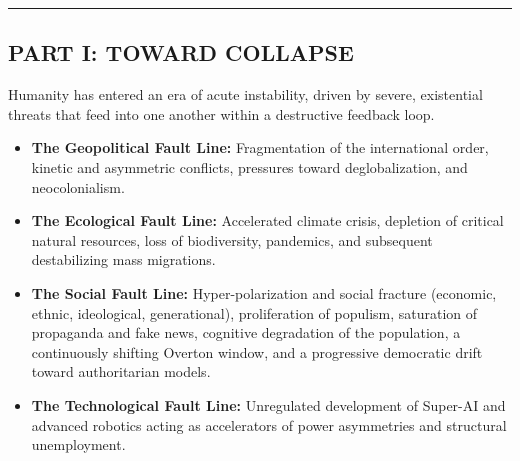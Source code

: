 \documentclass[11pt,a4paper,oneside]{article} %
\providecommand{\tightlist}{%
  \setlength{\itemsep}{0pt}\setlength{\parskip}{0pt}}
\begin{document}
\begin{center}\rule{0.5\linewidth}{0.5pt}\end{center}

\clearpage %
\hypertarget{part-i-toward-collapse}{%
\subsection{PART I: TOWARD COLLAPSE}\label{part-i-toward-collapse}}

\hypertarget{the-context-of-global-turbulence}{%
\label{the-context-of-global-turbulence}}

Humanity has entered an era of acute instability, driven by severe,
existential threats that feed into one another within a destructive
feedback loop.

\hypertarget{four-interconnected-fault-lines}{%
\label{four-interconnected-fault-lines}}

\begin{itemize}
\tightlist
\item
  \textbf{The Geopolitical Fault Line:} Fragmentation of the
  international order, kinetic and asymmetric conflicts, pressures
  toward deglobalization, and neocolonialism.
\item
  \textbf{The Ecological Fault Line:} Accelerated climate crisis,
  depletion of critical natural resources, loss of biodiversity,
  pandemics, and subsequent destabilizing mass migrations.
\item
  \textbf{The Social Fault Line:} Hyper-polarization and social fracture
  (economic, ethnic, ideological, generational), proliferation of
  populism, saturation of propaganda and fake news, cognitive
  degradation of the population, a continuously shifting Overton window,
  and a progressive democratic drift toward authoritarian models.
\item
  \textbf{The Technological Fault Line:} Unregulated development of
  Super-AI and advanced robotics acting as accelerators of power
  asymmetries and structural unemployment.
\end{itemize}

\hypertarget{systemic-interconnections-and-reinforcing-feedback-loops}{%
\label{systemic-interconnections-and-reinforcing-feedback-loops}}
\end{document}
